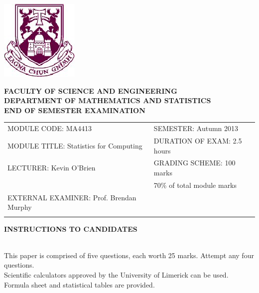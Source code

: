 \documentclass[a4paper,12pt]{article}
\begin{document}
\begin{center}
       \includegraphics[scale=0.60]{shieldtransparent2}
\end{center}

\begin{center}
\vspace{1cm}
\large \bf {FACULTY OF SCIENCE AND ENGINEERING} \\[0.5cm]
\normalsize DEPARTMENT OF MATHEMATICS AND STATISTICS \\[1.25cm]
\large \bf {END OF SEMESTER EXAMINATION} \\[1.5cm]
\end{center}

\begin{tabular}{ll}
MODULE CODE: MA4413 & SEMESTER: Autumn 2013\\[1cm]
MODULE TITLE: Statistics for Computing & DURATION OF EXAM: 2.5 hours \\[1cm]
LECTURER: Kevin O'Brien & GRADING SCHEME: 100 marks\\
 & \phantom{GRADING SCHEME:} \footnotesize {70\% of total module marks}   \\[0.8cm]
EXTERNAL EXAMINER: Prof. Brendan Murphy & \\[1cm]
\\[1cm]
\end{tabular}
\begin{center}
{\bf INSTRUCTIONS TO CANDIDATES}
\end{center}

{\noindent \\ This paper is comprised of five questions, each worth 25 marks. Attempt any four questions.
\\ Scientific calculators approved by the University of Limerick can be used. 
\\ Formula sheet and statistical tables are provided.
}
\normalsize
\newpage
\end{document}
